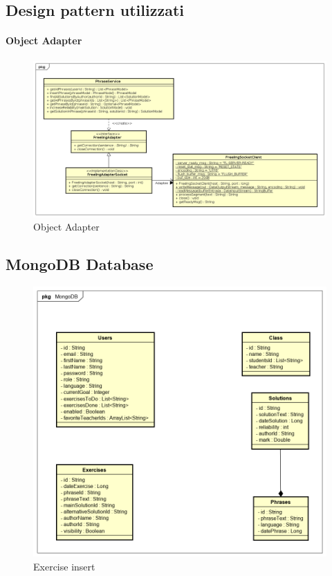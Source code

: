 \subsection{Design pattern utilizzati}
\paragraph{Object Adapter}
\label{sec:Object Adapter}
\begin{figure}[H]
\centering
\includegraphics[width=17cm, keepaspectratio]{img/Adapter.png} 
\caption{Object Adapter}
\end{figure}

\subsection{MongoDB Database}
\begin{figure}[H]
\centering
\includegraphics[width=17cm, keepaspectratio]{img/mongodb.png} 
\caption{Exercise insert}
\end{figure}